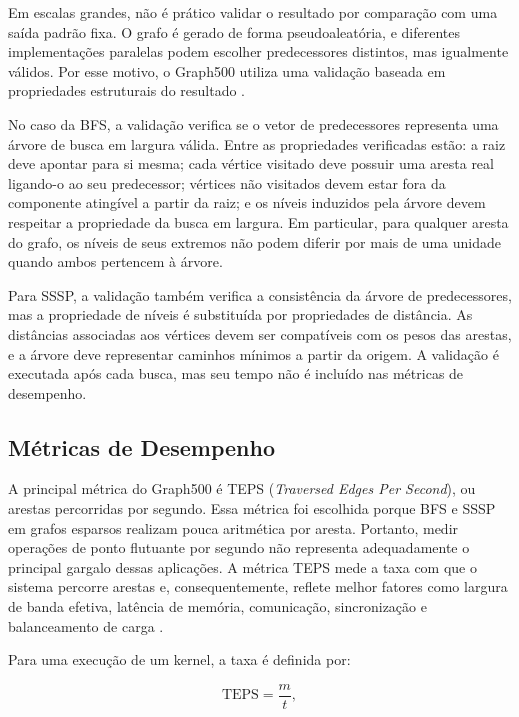 Em escalas grandes, não é prático validar o resultado por comparação com uma saída padrão fixa. O grafo é gerado de forma pseudoaleatória, e diferentes implementações paralelas podem escolher predecessores distintos, mas igualmente válidos. Por esse motivo, o Graph500 utiliza uma validação baseada em propriedades estruturais do resultado \cite{graph500spec}.

No caso da BFS, a validação verifica se o vetor de predecessores representa uma árvore de busca em largura válida. Entre as propriedades verificadas estão: a raiz deve apontar para si mesma; cada vértice visitado deve possuir uma aresta real ligando-o ao seu predecessor; vértices não visitados devem estar fora da componente atingível a partir da raiz; e os níveis induzidos pela árvore devem respeitar a propriedade da busca em largura. Em particular, para qualquer aresta do grafo, os níveis de seus extremos não podem diferir por mais de uma unidade quando ambos pertencem à árvore.

Para SSSP, a validação também verifica a consistência da árvore de predecessores, mas a propriedade de níveis é substituída por propriedades de distância. As distâncias associadas aos vértices devem ser compatíveis com os pesos das arestas, e a árvore deve representar caminhos mínimos a partir da origem. A validação é executada após cada busca, mas seu tempo não é incluído nas métricas de desempenho.


\subsection{Métricas de Desempenho}
\label{sec:graph500-metricas}

A principal métrica do Graph500 é TEPS (\textit{Traversed Edges Per Second}), ou arestas percorridas por segundo. Essa métrica foi escolhida porque BFS e SSSP em grafos esparsos realizam pouca aritmética por aresta. Portanto, medir operações de ponto flutuante por segundo não representa adequadamente o principal gargalo dessas aplicações. A métrica TEPS mede a taxa com que o sistema percorre arestas e, consequentemente, reflete melhor fatores como largura de banda efetiva, latência de memória, comunicação, sincronização e balanceamento de carga \cite{graph500spec}.

Para uma execução de um kernel, a taxa é definida por:

\begin{equation}
\mathrm{TEPS} = \frac{m}{t},
\end{equation}

